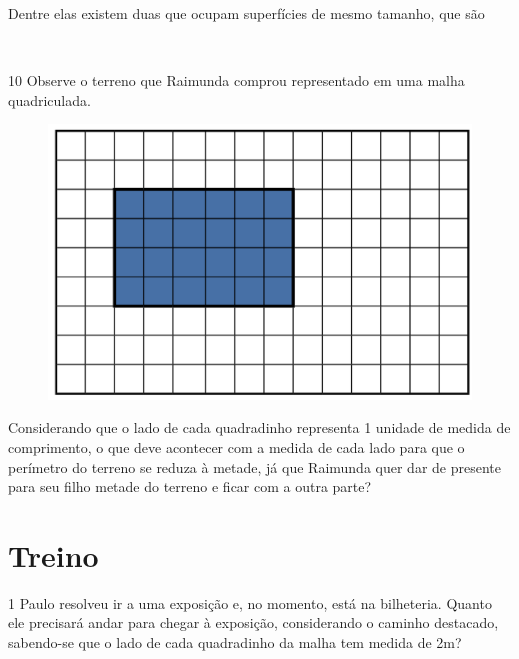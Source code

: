 Dentre elas existem duas que ocupam superfícies de mesmo tamanho, que são

\\

\num{10} Observe o terreno que Raimunda comprou representado em uma malha
quadriculada.

\begin{figure}[htpb!]
\centering
\includegraphics[width=.9\textwidth]{../ilustracoes/MAT5/SAEB_5ANO_MAT_figura45.png}
\end{figure}

\pagebreak
Considerando que o lado de cada quadradinho representa 1 unidade de
medida de comprimento, o que deve acontecer com a medida de cada lado
para que o perímetro do terreno se reduza à metade, já que Raimunda quer
dar de presente para seu filho metade do terreno e ficar com a outra
parte?

\begin{mdframed}[linewidth=2pt,linecolor=salmao]
\mbox{}\vspace*{3cm}
\end{mdframed}

\section*{Treino}

\num{1} Paulo resolveu ir a uma exposição e, no momento, está na bilheteria. Quanto ele precisará andar para chegar à exposição,
considerando o caminho destacado, sabendo-se que o lado de cada quadradinho da malha tem medida de 2m?

